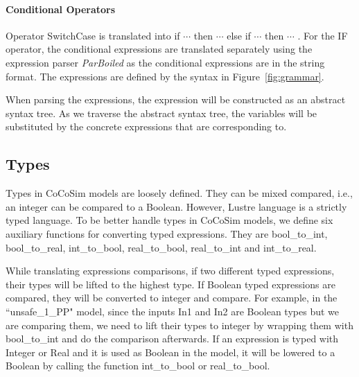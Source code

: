 \documentclass{article}
\begin{document}
\paragraph{Conditional Operators}
Operator SwitchCase is translated into \textsf{if $\cdots$ then $\cdots$ else if $\cdots$ then $\cdots$ }. 
For the IF operator, the conditional expressions are translated separately using the
expression parser \emph{ParBoiled} as the conditional expressions are in the string format. 
The expressions are defined by the syntax in Figure~\ref{fig:grammar}.

When parsing the expressions, the expression will be constructed as an abstract syntax tree. 
As we traverse the abstract syntax tree, the variables will be substituted by the concrete expressions
that are corresponding to.

\subsection{Types}

Types in CoCoSim models are loosely defined. 
They can be mixed compared, i.e., an integer can be compared to a Boolean.
However, Lustre language is a strictly typed language.
To be better handle types in CoCoSim models, we define six auxiliary functions
for converting typed expressions.
They are \textsf{bool\_to\_int, bool\_to\_real, int\_to\_bool, 
real\_to\_bool, real\_to\_int} and \textsf{int\_to\_real}. 

While translating expressions comparisons, if two different typed expressions, their types will be lifted to the highest type.
If Boolean typed expressions are compared, they will be converted to integer and compare.
For example, in the ``unsafe\_1\_PP" model, since the inputs In1 and In2 are Boolean types but we are comparing them, we need to lift their types to integer by wrapping them with \textsf{bool\_to\_int} and do the comparison afterwards. 
If an expression is typed with Integer or Real and it is used as Boolean in the model,  it will be lowered 
to a Boolean by calling the function \textsf{int\_to\_bool} or \textsf{real\_to\_bool}.
 
\end{document}
